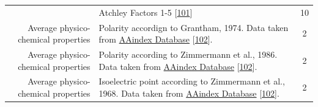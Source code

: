 \documentclass[12pt,a4paper,twoside]{book}
\theoremstyle{definition}
\theoremstyle{definition}
\theoremstyle{remark}
\begin{document}
\begin{longtable}[]{@{}rlc@{}}
\begin{minipage}[t]{0.23\columnwidth}
\end{minipage} & \begin{minipage}[t]{0.50\columnwidth}\raggedright\strut
Atchley Factors 1-5 {[}\protect\hyperlink{ref-Atchley2005}{101}{]}\strut
\end{minipage} & \begin{minipage}[t]{0.18\columnwidth}\centering\strut
10\strut
\end{minipage}\tabularnewline
\begin{minipage}[t]{0.23\columnwidth}\raggedleft\strut
Average physico-chemical properties\strut
\end{minipage} & \begin{minipage}[t]{0.50\columnwidth}\raggedright\strut
Polarity accordign to Grantham, 1974. Data taken from
\href{http://www.genome.jp/dbget-bin/www_bget?aaindex:GRAR740102}{AAindex
Database} {[}\protect\hyperlink{ref-Kawashima2008}{102}{]}.\strut
\end{minipage} & \begin{minipage}[t]{0.18\columnwidth}\centering\strut
2\strut
\end{minipage}\tabularnewline
\begin{minipage}[t]{0.23\columnwidth}\raggedleft\strut
Average physico-chemical properties\strut
\end{minipage} & \begin{minipage}[t]{0.50\columnwidth}\raggedright\strut
Polarity according to Zimmermann et al., 1986. Data taken from
\href{http://www.genome.jp/dbget-bin/www_bget?aaindex:ZIMJ680103}{AAindex
Database} {[}\protect\hyperlink{ref-Kawashima2008}{102}{]}.\strut
\end{minipage} & \begin{minipage}[t]{0.18\columnwidth}\centering\strut
2\strut
\end{minipage}\tabularnewline
\begin{minipage}[t]{0.23\columnwidth}\raggedleft\strut
Average physico-chemical properties\strut
\end{minipage} & \begin{minipage}[t]{0.50\columnwidth}\raggedright\strut
Isoelectric point according to Zimmermann et al., 1968. Data taken from
\href{http://www.genome.jp/dbget-bin/www_bget?aaindex:ZIMJ680104}{AAindex
Database} {[}\protect\hyperlink{ref-Kawashima2008}{102}{]}.\strut
\end{minipage} & \begin{minipage}[t]{0.18\columnwidth}\centering\strut
2\strut
\end{minipage}\tabularnewline

\end{longtable}
\end{document}
